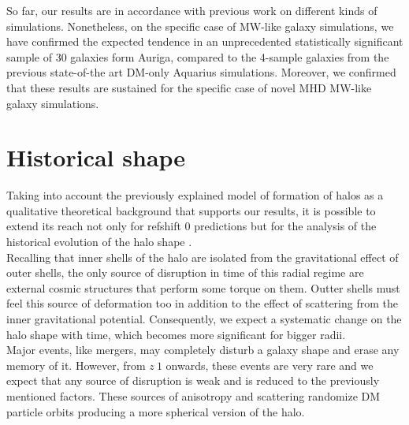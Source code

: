 So far, our results are in accordance with previous work on different kinds of simulations. Nonetheless, on the specific case of MW-like galaxy simulations, we have confirmed the expected tendence in an unprecedented statistically significant sample of 30 galaxies form Auriga, compared to the 4-sample galaxies from the previous state-of-the art DM-only Aquarius simulations. Moreover, we confirmed that these results are sustained for the specific case of novel MHD MW-like galaxy simulations.\\

\section{Historical shape}
Taking into account the previously explained model of formation of halos as a qualitative theoretical background that supports our results, it is possible to extend 
its reach not only for refshift 0 predictions but for the analysis of the historical evolution of the halo shape \cite{}.\\

 Recalling that inner shells of the halo are isolated from the gravitational effect of outer shells, the only source of disruption in time of this radial regime are external cosmic structures that perform some torque on them. Outter shells must feel this source of deformation too in addition to the effect of scattering from the inner gravitational potential. Consequently, we expect a systematic change on the halo shape with time, which becomes more significant for bigger radii.\\
 
Major events, like mergers, may completely disturb a galaxy shape and erase any memory of it. However, from $z~1$ onwards, these events are very rare \cite{} and we expect that any source of disruption is weak and is reduced to the previously mentioned factors. These sources of anisotropy and scattering randomize DM particle orbits producing a more spherical version of the halo. \cite{} \\  

